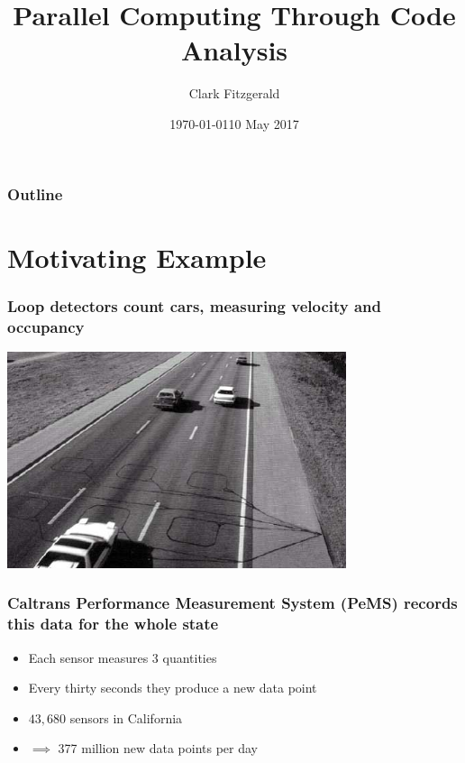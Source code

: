 \documentclass{beamer}
\begin{document}
\title{Parallel Computing Through Code Analysis}
\date{\today}
\date{10 May 2017}
\author{Clark Fitzgerald}

\frame{\titlepage}

\begin{frame}
    \frametitle{Outline}
    \tableofcontents
\end{frame}

\section{Motivating Example}
\begin{frame}

    \frametitle{Loop detectors count cars, measuring velocity and
    occupancy}

\centerline{\includegraphics[height=2.5in]{loop_detector.jpg}}

\end{frame}
\begin{frame}

\frametitle{Caltrans Performance Measurement System (PeMS) records this
data for the whole state}

    \begin{itemize}
        \item Each sensor measures 3 quantities
        \item Every thirty seconds they produce a new data point
        \item $43,680$ sensors in California
        \item $\implies$  377 million new data points per day
    \end{itemize}

\end{frame}
\end{document}
